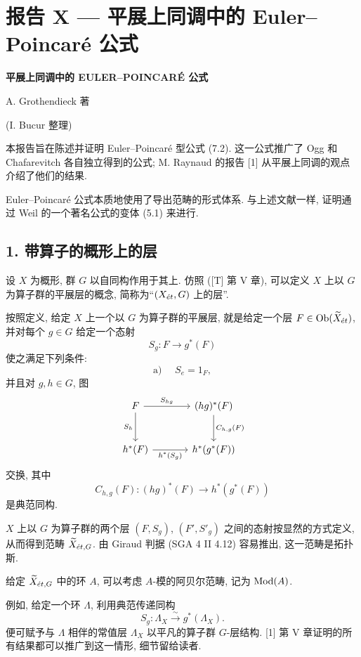 
\section*{报告 X --- 平展上同调中的 Euler--Poincaré 公式}

\begin{center}
\textbf{平展上同调中的 EULER--POINCARÉ 公式}

A. Grothendieck 著

(I. Bucur 整理)
\end{center}

本报告旨在陈述并证明 Euler--Poincaré 型公式 (7.2). 这一公式推广了 Ogg 和 Chafarevitch 各自独立得到的公式; M. Raynaud 的报告 [1] 从平展上同调的观点介绍了他们的结果.

Euler--Poincaré 公式本质地使用了导出范畴的形式体系. 与上述文献一样, 证明通过 Weil 的一个著名公式的变体 (5.1) 来进行.

\subsection*{1. 带算子的概形上的层}

设 $X$ 为概形, 群 $G$ 以自同构作用于其上. 仿照 ([T] 第 V 章), 可以定义 $X$ 上以 $G$ 为算子群的平展层的概念, 简称为“$(X_{\acute{e}t},G)$ 上的层”.

按照定义, 给定 $X$ 上一个以 $G$ 为算子群的平展层, 就是给定一个层 $F\in \operatorname{Ob}(\widetilde X_{\acute{e}t})$, 并对每个 $g\in G$ 给定一个态射
\[
S_g:F\longrightarrow g^*(F)
\]
使之满足下列条件:
\[
\text{a) }\quad S_e=1_F,
\]
并且对 $g,h\in G$, 图
\[
\begin{tikzcd}[column sep=large,row sep=large]
F \arrow[r,"S_{hg}"] \arrow[d,"S_h"'] & (hg)^*(F) \arrow[d,"C_{h,g}(F)"]\\
h^*(F) \arrow[r,"h^*(S_g)"'] & h^*(g^*(F))
\end{tikzcd}
\]
交换, 其中
\[
C_{h,g}(F):(hg)^*(F)\longrightarrow h^*(g^*(F))
\]
是典范同构.

$X$ 上以 $G$ 为算子群的两个层 $(F,S_g)$, $(F',S'_g)$ 之间的态射按显然的方式定义, 从而得到范畴 $\widetilde X_{\acute{e}t,G}$. 由 Giraud 判据 (SGA 4 II 4.12) 容易推出, 这一范畴是拓扑斯.

给定 $\widetilde X_{\acute{e}t,G}$ 中的环 $A$, 可以考虑 $A$-模的阿贝尔范畴, 记为 $\operatorname{Mod}(A)$.

例如, 给定一个环 $\Lambda$, 利用典范传递同构
\[
S_g:\Lambda_X\xrightarrow{\sim}g^*(\Lambda_X).
\]
便可赋予与 $\Lambda$ 相伴的常值层 $\Lambda_X$ 以平凡的算子群 $G$-层结构. [1] 第 V 章证明的所有结果都可以推广到这一情形, 细节留给读者.

